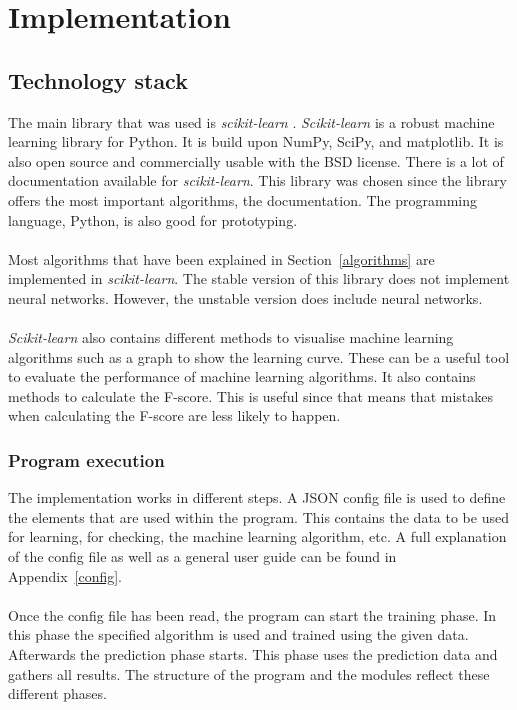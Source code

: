 
\chapter{Implementation} %

\label{implementation} %

\section{Technology stack}
\label{technology}
The main library that was used is \textit{scikit-learn} \cite{scikit-learn}. \textit{Scikit-learn} is a robust machine learning library for Python. It is build upon NumPy, SciPy, and matplotlib. It is also open source and commercially usable with the BSD license. There is a lot of documentation available for \textit{scikit-learn}. This library was chosen since the library offers the most important algorithms, the documentation. The programming language, Python, is also good for prototyping.  \\
\\
Most algorithms that have been explained in Section~\ref{algorithms} are implemented in \textit{scikit-learn}. The stable version of this library does not implement neural networks. However, the unstable version does include neural networks. \\
\\
\textit{Scikit-learn} also contains different methods to visualise machine learning algorithms such as a graph to show the learning curve. These can be a useful tool to evaluate the performance of machine learning algorithms. It also contains methods to calculate the F-score. This is useful since that means that mistakes when calculating the F-score are less likely to happen.

\subsection{Program execution}
The implementation works in different steps. A JSON config file is used to define the elements that are used within the program. This contains the data to be used for learning, for checking, the machine learning algorithm, etc. A full explanation of the config file as well as a general user guide can be found in Appendix~\ref{config}. \\
\\
Once the config file has been read, the program can start the training phase. In this phase the specified algorithm is used and trained using the given data. Afterwards the prediction phase starts.  This phase uses the prediction data and gathers all results. The structure of the program and the modules reflect these different phases.

